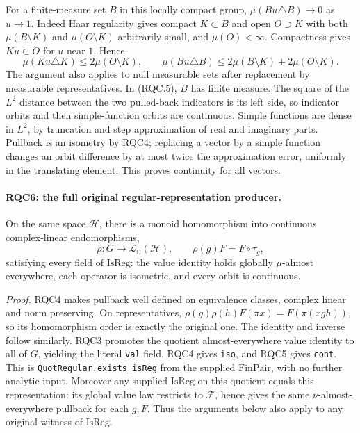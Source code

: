 For a finite-measure set \(B\) in this locally compact group,
\(\mu(Bu\triangle B)\to0\) as \(u\to1\).
Indeed Haar regularity gives compact \(K\subset B\) and open
\(O\supset K\) with both \(\mu(B\setminus K)\) and
\(\mu(O\setminus K)\) arbitrarily small, and \(\mu(O)<\infty\).
Compactness gives \(Ku\subset O\) for \(u\) near \(1\).  Hence
\[
 \mu(Ku\triangle K)\le2\mu(O\setminus K),\qquad
 \mu(Bu\triangle B)\le
 2\mu(B\setminus K)+2\mu(O\setminus K).
 \tag{RQC.7}
\]
The argument also applies to null measurable sets after replacement
by measurable representatives.  In (RQC.5), \(B\) has finite
measure.  The square of the \(L^2\) distance between the two
pulled-back indicators is its left side, so indicator orbits and
then simple-function orbits are continuous.  Simple functions are
dense in \(L^2\), by truncation and step approximation of real and
imaginary parts.  Pullback is an isometry by RQC4; replacing a
vector by a simple function changes an orbit difference by at
most twice the approximation error, uniformly in the translating
element.  This proves continuity for all vectors.

\paragraph{RQC6: the full original regular-representation producer.}
\label{claim:RQC6}
On the same space \(\mathcal H\), there is a monoid homomorphism
into continuous complex-linear endomorphisms,
\[
 \rho:G\longrightarrow\mathcal L_{\mathbb C}(\mathcal H),
 \qquad \rho(g)F=F\circ\tau_g,
 \tag{RQC.8}
\]
satisfying every field of \(\mathrm{IsReg}\): the value identity
holds globally \(\mu\)-almost everywhere, each operator is
isometric, and every orbit is continuous.

\emph{Proof.}
RQC4 makes pullback well defined on equivalence classes, complex
linear and norm preserving.  On representatives,
\(\rho(g)\rho(h)F(\pi x)=F(\pi(xgh))\), so its homomorphism
order is exactly the original one.  The identity and inverse
follow similarly.  RQC3 promotes the quotient almost-everywhere
value identity to all of \(G\), yielding the literal
\texttt{val} field.  RQC4 gives \texttt{iso}, and RQC5 gives
\texttt{cont}.  This is \texttt{QuotRegular.exists\_isReg} from the
supplied \(\mathrm{FinPair}\), with no further analytic input.
Moreover any supplied \(\mathrm{IsReg}\) on this quotient equals
this representation: its global value law restricts to
\(\mathcal F\), hence gives the same \(\nu\)-almost-everywhere
pullback for each \(g,F\).  Thus the arguments below also apply
to any original witness of \(\mathrm{IsReg}\).

